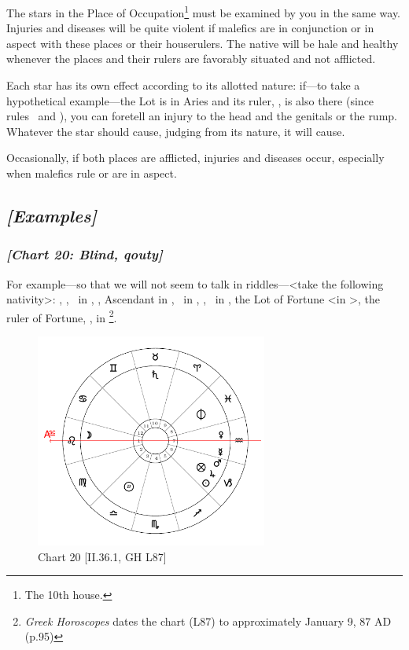 The stars in the Place of Occupation\footnote{The 10th house.} must be examined by you in the same way. Injuries and diseases will be quite violent if malefics are in conjunction or in aspect with these places or their houserulers. The native will be hale and healthy whenever the places and their rulers are favorably situated and not afflicted.

Each star has its own effect according to its allotted nature: if—to take a hypothetical example—the Lot is in Aries and its ruler, \Mars, is also there (since \Mars\, rules \Aries\, and \Scorpio), you can foretell an injury
to the head and the genitals or the rump. Whatever the star should cause, judging from its nature, it will cause. 

Occasionally, if both places are afflicted, injuries and diseases occur, especially when malefics rule or
are in aspect. 
\newpage
\subsection{\textit{[Examples]}}
\subsubsection{\textit{[Chart 20: Blind, qouty]}}
For example—so that we will not seem to talk in riddles—<take the following nativity>: \Sun, \Jupiter,
\Mars\, in \Capricorn, \Moon, Ascendant in \Leo, \Saturn\, in \Taurus, \Venus, \Mercury\, in \Aquarius, the Lot of Fortune <in \Capricorn>, the ruler of Fortune, \Saturn, in \Taurus
\footnote{\textit{Greek Horoscopes} dates the chart (L87) to approximately January 9, 87 AD (p.95)}.

\clearpage
\begin{figure}
\centering
\vspace{-20pt}
\includegraphics[width=0.68\textwidth]{charts/2_36_1}
\caption{Chart 20 [II.36.1, GH L87]}
\label{fig:chart20}
\end{figure}

